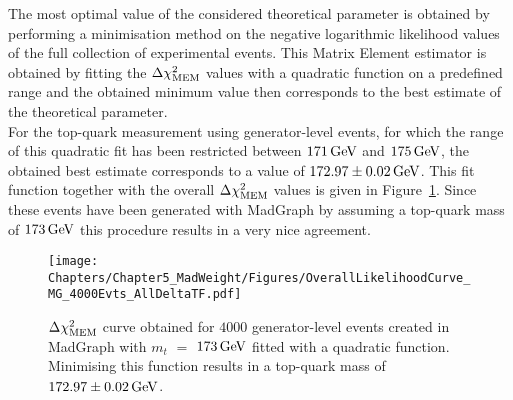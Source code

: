 The most optimal value of the considered theoretical parameter is obtained by performing a minimisation method on the negative logarithmic likelihood values of the full collection of experimental events.
This Matrix Element estimator is obtained by fitting the $\Delta \chi^{2}_{\textrm{MEM}}$ values with a quadratic function on a predefined range and the obtained minimum value then corresponds to the best estimate of the theoretical parameter.
\\
For the top-quark measurement using generator-level events, for which the range of this quadratic fit has been restricted between $171 \, \mathrm{GeV}$ and $175 \, \mathrm{GeV}$, the obtained best estimate corresponds to a value of $172.97 \pm 0.02 \, \mathrm{GeV}$. This fit function together with the overall $\Delta \chi^{2}_{\textrm{MEM}}$ values is given in Figure~\ref{fig::FitMTGen}.
Since these events have been generated with MadGraph by assuming a top-quark mass of $173 \, \mathrm{GeV}$ this procedure results in a very nice agreement.
\\
\begin{figure}[h!tb]
 \centering
 \texttt{[image: Chapters/Chapter5\_MadWeight/Figures/OverallLikelihoodCurve\_MG\_4000Evts\_AllDeltaTF.pdf]}
 \caption{$\Delta \chi^{2}_{\textrm{MEM}}$ curve obtained for $4 000$ generator-level events created in MadGraph with $m_{t}$ $=$ $173 \, \mathrm{GeV}$ fitted with a quadratic function. Minimising this function results in a top-quark mass of $172.97 \pm 0.02 \, \mathrm{GeV}$.}\label{fig::FitMTGen}
\end{figure}

